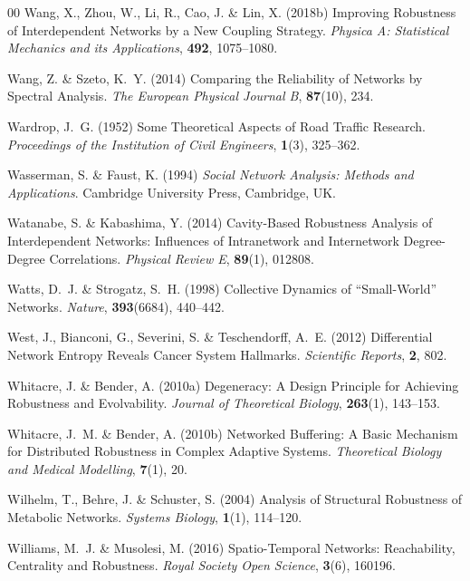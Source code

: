 \documentclass{comnet-mod}
\begin{document}
\begin{thebibliography}{00}
Wang, X., Zhou, W., Li, R., Cao, J. {\&} Lin, X. (2018b)  {Improving Robustness
  of Interdependent Networks by a New Coupling Strategy}. {\em {Physica A:
  Statistical Mechanics and its Applications}}, \textbf{492}, 1075--1080.

Wang, Z. {\&} Szeto, K.~Y. (2014)  {Comparing the Reliability of Networks by
  Spectral Analysis}. {\em {The European Physical Journal B}}, \textbf{87}(10),
  234.

Wardrop, J.~G. (1952)  {Some Theoretical Aspects of Road Traffic Research}.
  {\em {Proceedings of the Institution of Civil Engineers}}, \textbf{1}(3),
  325--362.

Wasserman, S. {\&} Faust, K. (1994) {\em Social {{Network Analysis}}:
  {{Methods}} and {{Applications}}}.
Cambridge University Press, Cambridge, UK.

Watanabe, S. {\&} Kabashima, Y. (2014)  {Cavity-Based Robustness Analysis of
  Interdependent Networks: {{Influences}} of Intranetwork and Internetwork
  Degree-Degree Correlations}. {\em {Physical Review E}}, \textbf{89}(1),
  012808.

Watts, D.~J. {\&} Strogatz, S.~H. (1998)  {Collective Dynamics of
  ``{{Small-World}}'' Networks}. {\em {Nature}}, \textbf{393}(6684), 440--442.

West, J., Bianconi, G., Severini, S. {\&} Teschendorff, A.~E. (2012)
  {Differential Network Entropy Reveals Cancer System Hallmarks}. {\em
  {Scientific Reports}}, \textbf{2}, 802.

Whitacre, J. {\&} Bender, A. (2010a)  {Degeneracy: {{A}} Design Principle for
  Achieving Robustness and Evolvability}. {\em {Journal of Theoretical
  Biology}}, \textbf{263}(1), 143--153.

Whitacre, J.~M. {\&} Bender, A. (2010b)  {Networked Buffering: {{A}} Basic
  Mechanism for Distributed Robustness in Complex Adaptive Systems}. {\em
  {Theoretical Biology and Medical Modelling}}, \textbf{7}(1), 20.

Wilhelm, T., Behre, J. {\&} Schuster, S. (2004)  {Analysis of Structural
  Robustness of Metabolic Networks}. {\em {Systems Biology}}, \textbf{1}(1),
  114--120.

Williams, M.~J. {\&} Musolesi, M. (2016)  {Spatio-Temporal Networks:
  {{Reachability}}, Centrality and Robustness}. {\em {Royal Society Open
  Science}}, \textbf{3}(6), 160196.


\end{thebibliography}
\end{document}

